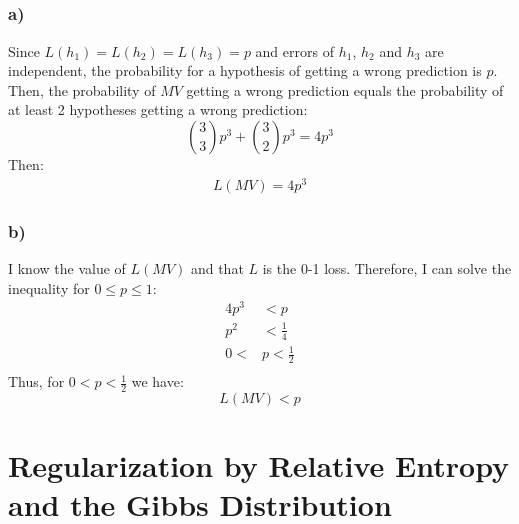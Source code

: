 \documentclass[a4paper]{article}
\begin{document}
\subsection{}
\label{subsec:23}
\subsubsection*{a)}
Since $L(h_1) = L(h_2) = L(h_3) = p$ and errors of $h_1$, $h_2$ and $h_3$ are
independent, the probability for a hypothesis of getting a wrong prediction is
$p$. Then, the probability of $MV$ getting a wrong prediction equals the
probability of at least 2 hypotheses getting a wrong prediction:
\[
\binom{3}{3}p^3 + \binom{3}{2}p^3 = 4p^3
\]
Then:
\begin{align*}
  L(MV) = 4p^3
\end{align*}

\subsubsection*{b)}
I know the value of $L(MV)$ and that $L$ is the 0-1 loss. 
Therefore, I can solve the inequality for $0 \leq p \leq  1$:
\begin{align*}
  4p^3 &< p\\
  p^2 &< \frac{1}{4}\\
  0 < &p < \frac{1}{2}\\
\end{align*}
Thus, for $0 < p < \frac{1}{2}$ we have:
\[
L(MV) < p
\]

\section{Regularization by Relative Entropy and the Gibbs Distribution}
\label{sec:2}
\end{document}
